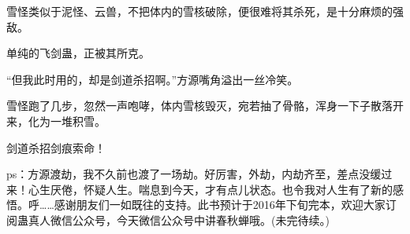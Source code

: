 \begin{this_body}
雪怪类似于泥怪、云兽，不把体内的雪核破除，便很难将其杀死，是十分麻烦的强敌。

单纯的飞剑蛊，正被其所克。

“但我此时用的，却是剑道杀招啊。”方源嘴角溢出一丝冷笑。

雪怪跑了几步，忽然一声咆哮，体内雪核毁灭，宛若抽了骨骼，浑身一下子散落开来，化为一堆积雪。

剑道杀招剑痕索命！

ps：方源渡劫，我不久前也渡了一场劫。好厉害，外劫，内劫齐至，差点没缓过来！心生厌倦，怀疑人生。喘息到今天，才有点儿状态。也令我对人生有了新的感悟。呼……感谢朋友们一如既往的支持。此书预计于2016年下旬完本，欢迎大家订阅蛊真人微信公众号，今天微信公众号中讲春秋蝉哦。(未完待续。)

\end{this_body}

